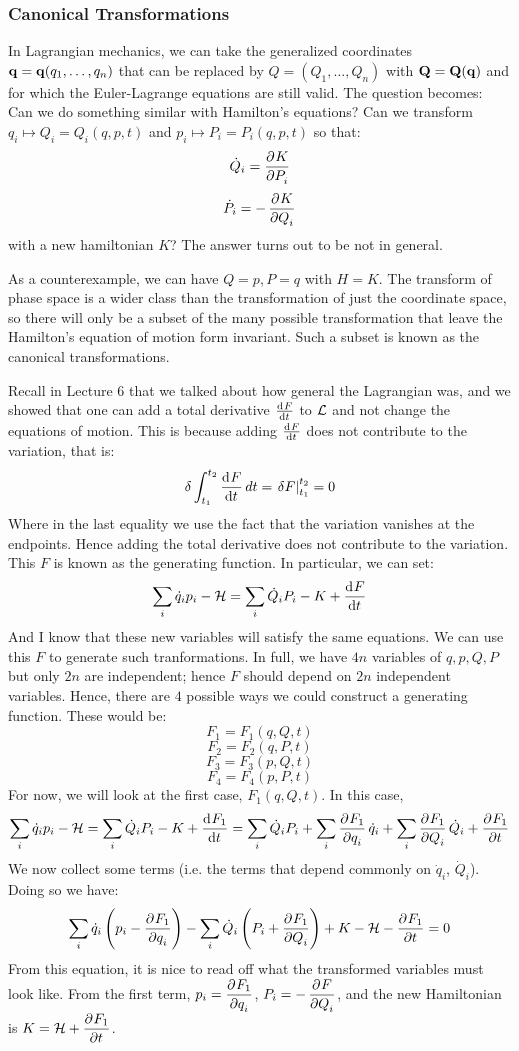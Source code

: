 \subsubsection{Canonical Transformations}
In Lagrangian mechanics, we can take the generalized coordinates $\mathbf{q} = \mathbf{q}(q_1, \ldots, q_n)$ that can be replaced by $Q = (Q_1, \ldots, Q_n)$ with $\mathbf{Q} = \mathbf{Q}(\mathbf{q})$ and for which the Euler-Lagrange equations are still valid. The question becomes: Can we do something similar with Hamilton's equations? Can we transform $q_i \mapsto Q_i = Q_i(q, p, t)$ and $p_i \mapsto P_i = P_i(q, p, t)$ so that:
\[\dot{Q}_i = \dpd{K}{P_i}\]
\[\dot{P}_i = -\dpd{K}{Q_i}\]
with a new hamiltonian $K$? The answer turns out to be not in general.

\noindent As a counterexample, we can have $Q = p, P = q$ with $H = K$. The transform of phase space is a wider class than the transformation of just the coordinate space, so there will only be a subset of the many possible transformation that leave the Hamilton's equation of motion form invariant. Such a subset is known as the canonical transformations. 

\noindent Recall in Lecture 6 that we talked about how general the Lagrangian was, and we showed that one can add a total derivative $\od{F}{t}$ to $\mathcal{L}$ and not change the equations of motion. This is because adding $\od{F}{t}$ does not contribute to the variation, that is:
\[\delta \int_{t_1}^{t_2} \dod{F}{t}dt = \left. \delta F\right|_{t_1}^{t_2} = 0\]
Where in the last equality we use the fact that the variation vanishes at the endpoints. Hence adding the total derivative does not contribute to the variation. This $F$ is known as the generating function. In particular, we can set:
\[\sum_i \dot{q}_i p_i - \HH = \sum_i\dot{Q}_iP_i - K + \dod{F}{t}\]
And I know that these new variables will satisfy the same equations. We can use this $F$ to generate such tranformations. In full, we have $4n$ variables of $q, p, Q, P$ but only $2n$ are independent; hence $F$ should depend on $2n$ independent variables. Hence, there are $4$ possible ways we could construct a generating function. These would be:
\[F_1 = F_1(q, Q, t)\]
\[F_2 = F_2(q, P, t)\]
\[F_3 = F_3(p, Q, t)\]
\[F_4 = F_4(p, P, t)\]
For now, we will look at the first case, $F_1(q, Q, t)$. In this case, 
\[\sum_i \dot{q}_i p_i - \HH = \sum_i \dot{Q}_i P_i - K + \dod{F_1}{t} = \sum_{i}\dot{Q}_iP_i +\sum_i\dpd{F_1}{q_i}\dot{q}_i + \sum_i \dpd{F_1}{Q_i}\dot{Q}_i + \dpd{F_1}{t}\]
We now collect some terms (i.e. the terms that depend commonly on $\dot{q}_i$, $\dot{Q}_i$). Doing so we have:
\[\sum_i \dot{q}_i\left(p_i - \dpd{F_1}{q_i}\right) - \sum_i\dot{Q}_i\left(P_i + \dpd{F_1}{Q_i}\right) + K - \HH - \dpd{F_1}{t} = 0\]
From this equation, it is nice to read off what the transformed variables must look like. From the first term, $p_i = \dpd{F_1}{q_i}$, $P_i = -\dpd{F}{Q_i}$, and the new Hamiltonian is $K = \HH + \dpd{F_1}{t}$.

